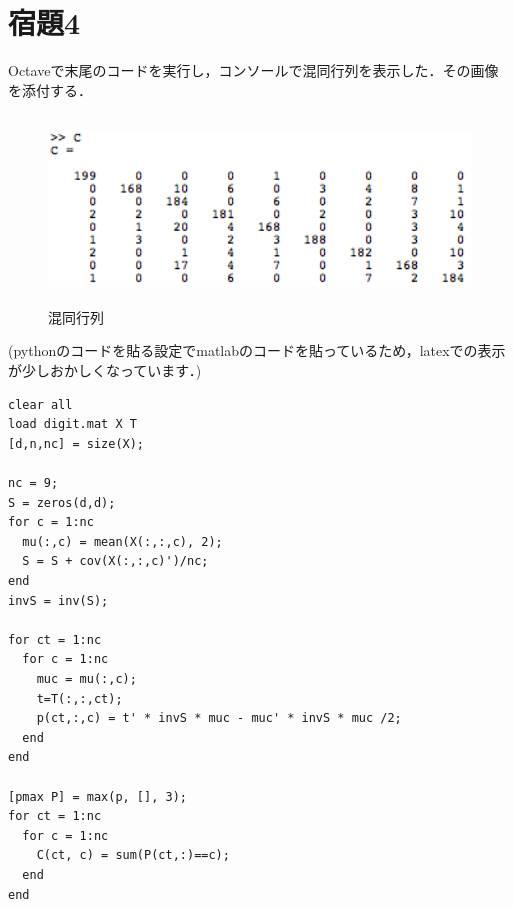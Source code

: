 \documentclass[11pt,a4paper,dvipdfmx]{article}
\theoremstyle{plain}
\newcommand{\1}{\mbox{1}\hspace{-0.25em}\mbox{l}}
\begin{document}
\section*{宿題4}
Octaveで末尾のコードを実行し，コンソールで混同行列を表示した．その画像を添付する．
\begin{figure}[H]
  \centering
    \includegraphics[height=5cm]{image/c.png}
    \caption{\footnotesize 混同行列}
    \label{fig:prob4}
\end{figure}


(pythonのコードを貼る設定でmatlabのコードを貼っているため，latexでの表示が少しおかしくなっています．)
\begin{lstlisting}[caption=digits]
clear all
load digit.mat X T
[d,n,nc] = size(X);

nc = 9;
S = zeros(d,d);
for c = 1:nc
  mu(:,c) = mean(X(:,:,c), 2);
  S = S + cov(X(:,:,c)')/nc;
end
invS = inv(S);

for ct = 1:nc
  for c = 1:nc
    muc = mu(:,c);
    t=T(:,:,ct);
    p(ct,:,c) = t' * invS * muc - muc' * invS * muc /2;
  end
end

[pmax P] = max(p, [], 3);
for ct = 1:nc
  for c = 1:nc
    C(ct, c) = sum(P(ct,:)==c);
  end
end
\end{lstlisting}
\end{document}
